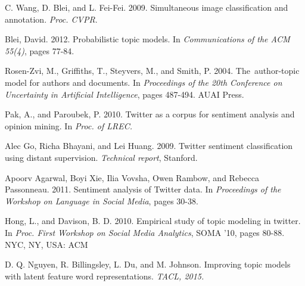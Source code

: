 \documentclass[12pt]{amsart}
\newcommand{\0}{\mat{0}}
\newcommand{\1}{\mathds{1}}
\begin{document}
\begin{thebibliography}{1}

	 C. Wang, D. Blei, and L. Fei-Fei. 2009. Simultaneous image classification and annotation. \emph{Proc. CVPR}. 
	
	 Blei, David. 2012. Probabilistic topic models. In \emph{Communications of the ACM 55(4)}, pages 77-84.

	  Rosen-Zvi, M., Griffiths, T., Steyvers, M., and Smith, P. 2004. The author-topic model for authors and documents. In \emph{Proceedings of the 20th Conference on Uncertainty in Artificial Intelligence}, pages 487-494. AUAI Press.\smallskip
	
	 Pak, A., and Paroubek, P. 2010. Twitter as a corpus for sentiment analysis and opinion mining. In \emph{Proc. of LREC.}\smallskip
	
	 Alec Go, Richa Bhayani, and Lei Huang. 2009. Twitter sentiment classification using distant supervision. \emph{Technical report}, Stanford.
	
	 Apoorv Agarwal, Boyi Xie, Ilia Vovsha, Owen Rambow, and Rebecca Passonneau. 2011. Sentiment analysis of Twitter data. In \emph{Proceedings of the Workshop on Language in Social Media}, pages 30-38.
	
	 Hong, L., and Davison, B. D. 2010. Empirical study of topic modeling in twitter. In \emph{Proc. First Workshop on Social Media Analytics}, SOMA ’10, pages 80-88. NYC, NY, USA: ACM
	
	 D. Q. Nguyen, R. Billingsley, L. Du, and M. Johnson. Improving topic models with latent feature word representations. \emph{TACL, 2015.
	}
	
\end{thebibliography}


 

\end{document}
